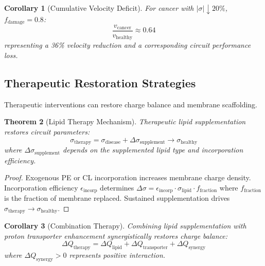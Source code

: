 \documentclass[11pt,twocolumn,a4paper]{article}
\newtheorem{theorem}{Theorem}[section]
\newtheorem{corollary}[theorem]{Corollary}
\theoremstyle{definition}
\theoremstyle{remark}
\begin{document}
\begin{corollary}[Cumulative Velocity Deficit]
\label{cor:cumulative_deficit}
For cancer with $|\sigma| \downarrow 20\%$, $f_{\text{damage}} = 0.8$:
\begin{equation}
\frac{v_{\text{cancer}}}{v_{\text{healthy}}} \approx 0.64
\end{equation}
representing a 36\% velocity reduction and a corresponding circuit performance loss.
\end{corollary}

\subsection{Therapeutic Restoration Strategies}

Therapeutic interventions can restore charge balance and membrane scaffolding.

\begin{theorem}[Lipid Therapy Mechanism]
\label{thm:lipid_therapy}
Therapeutic lipid supplementation restores circuit parameters:
\begin{equation}
\sigma_{\text{therapy}} = \sigma_{\text{disease}} + \Delta \sigma_{\text{supplement}} \to \sigma_{\text{healthy}}
\end{equation}
where $\Delta \sigma_{\text{supplement}}$ depends on the supplemented lipid type and incorporation efficiency.
\end{theorem}

\begin{proof}
Exogenous PE or CL incorporation increases membrane charge density. Incorporation efficiency $\epsilon_{\text{incorp}}$ determines $\Delta \sigma = \epsilon_{\text{incorp}} \cdot \sigma_{\text{lipid}} \cdot f_{\text{fraction}}$ where $f_{\text{fraction}}$ is the fraction of membrane replaced. Sustained supplementation drives $\sigma_{\text{therapy}} \to \sigma_{\text{healthy}}$.
\end{proof}

\begin{corollary}[Combination Therapy]
\label{cor:combination_therapy}
Combining lipid supplementation with proton transporter enhancement synergistically restores charge balance:
\begin{equation}
\Delta Q_{\text{therapy}} = \Delta Q_{\text{lipid}} + \Delta Q_{\text{transporter}} + \Delta Q_{\text{synergy}}
\end{equation}
where $\Delta Q_{\text{synergy}} > 0$ represents positive interaction.
\end{corollary}
\end{document}
